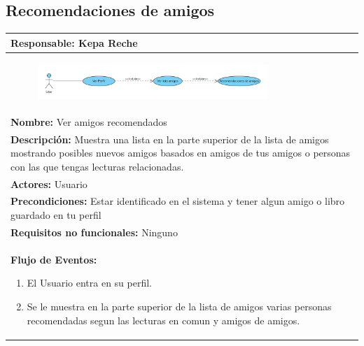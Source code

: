 \documentclass{report}
\begin{document}
            \subsection{Recomendaciones de amigos}
                \begin{center}
                    \begin{longtable}{|p{\linewidth}|}
                        \hline
                        \textbf{Responsable:} Kepa Reche\\
                        \hline
                        \begin{figure}[H]
                            \centering
                            \includegraphics[width=0.8\textwidth]{./img/casos_uso/CasosDeUsoRecomendacionDeAmigos.PNG}
                        \end{figure}\\
                        \hline
                        \textbf{Nombre:} Ver amigos recomendados\\
                        \hline
                        \textbf{Descripción:} Muestra una lista en la parte superior de la lista de amigos mostrando posibles nuevos amigos basados en amigos de tus amigos o personas con las que tengas lecturas relacionadas.\\
                        \hline
                        \textbf{Actores:} Usuario\\
                        \hline
                        \textbf{Precondiciones:} Estar identificado en el sistema y tener algun amigo o libro guardado en tu perfil\\
                        \hline
                        \textbf{Requisitos no funcionales:} Ninguno\\
                        \hline
                        \textbf{Flujo de Eventos:}
                        \begin{enumerate}
                            \item El Usuario entra en su perfil.
                            \item Se le muestra en la parte superior de la lista de amigos varias personas recomendadas segun las lecturas en comun y amigos de amigos.
                        \end{enumerate}\\

\end{longtable}
\end{center}
\end{document}
